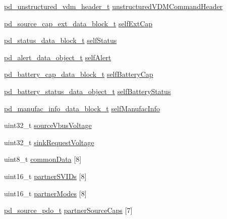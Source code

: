 \begin{DoxyCompactItemize}
\item 
\hyperlink{group__usb__pd__stack_ga8e40e5f802e7758a04876e59a137c3b1}{pd\-\_\-unstructured\-\_\-vdm\-\_\-header\-\_\-t} \hyperlink{struct__pd__app_a32b118d435397c3f4bbe690c4e30d354}{unstructured\-V\-D\-M\-Command\-Header}
\item 
\hyperlink{pd__app_8h_a48136dc14cb8a1f83b2c425508704d1b}{pd\-\_\-source\-\_\-cap\-\_\-ext\-\_\-data\-\_\-block\-\_\-t} \hyperlink{struct__pd__app_aeb76e6e3f6c697b91755a540ee5772cf}{self\-Ext\-Cap}
\item 
\hyperlink{pd__app_8h_a3c48d8d5b263e585588f5bfe508978c6}{pd\-\_\-status\-\_\-data\-\_\-block\-\_\-t} \hyperlink{struct__pd__app_a6e05e1216ffa724cfb21c279323020b3}{self\-Status}
\item 
\hyperlink{pd__app_8h_a4890f2e2b689f24e055912a325a72748}{pd\-\_\-alert\-\_\-data\-\_\-object\-\_\-t} \hyperlink{struct__pd__app_a4461b57a4d3ff16523050f987b0dd53e}{self\-Alert}
\item 
\hyperlink{pd__app_8h_aea5fa03c1161f9f964ff0f9d8f0c5dc1}{pd\-\_\-battery\-\_\-cap\-\_\-data\-\_\-block\-\_\-t} \hyperlink{struct__pd__app_a69b5c0754997308fe2ad9308d7bb3622}{self\-Battery\-Cap}
\item 
\hyperlink{pd__app_8h_a85756978e48572ee52a6090ea4a2a400}{pd\-\_\-battery\-\_\-status\-\_\-data\-\_\-object\-\_\-t} \hyperlink{struct__pd__app_a2aeaaa8274da80148c91444df5a8bda3}{self\-Battery\-Status}
\item 
\hyperlink{pd__app_8h_a7ced852e8d03d36a6453dc1a0eccada5}{pd\-\_\-manufac\-\_\-info\-\_\-data\-\_\-block\-\_\-t} \hyperlink{struct__pd__app_a8a105b2e53346e00f5ce2304ab67796a}{self\-Manufac\-Info}
\item 
uint32\-\_\-t \hyperlink{struct__pd__app_abcf864ac3f98a5cb50592cd6110be6a0}{source\-Vbus\-Voltage}
\item 
uint32\-\_\-t \hyperlink{struct__pd__app_aaef3da806ed2695378c7ce5cc01462d5}{sink\-Request\-Voltage}
\item 
uint8\-\_\-t \hyperlink{struct__pd__app_a50a27918c703e893aab653aef204e744}{common\-Data} \mbox{[}8\mbox{]}
\item 
uint16\-\_\-t \hyperlink{struct__pd__app_a595e9d8b83e3ba15e9eaa30252ea865f}{partner\-S\-V\-I\-Ds} \mbox{[}8\mbox{]}
\item 
uint16\-\_\-t \hyperlink{struct__pd__app_a627bddd71b69afb7c7347ffd9f59ca84}{partner\-Modes} \mbox{[}8\mbox{]}
\item 
\hyperlink{group__usb__pd__stack_gae3adfd5239231ab405b04bef0ae1df5a}{pd\-\_\-source\-\_\-pdo\-\_\-t} \hyperlink{struct__pd__app_ac8c4ef05a14fc26bacd62f1937726488}{partner\-Source\-Caps} \mbox{[}7\mbox{]}

\end{DoxyCompactItemize}
